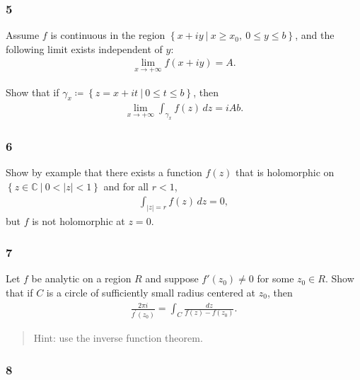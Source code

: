 \hypertarget{section-52}{%
\subsubsection{5}\label{section-52}}

Assume \(f\) is continuous in the region
\(\left\{{x+iy {~\mathrel{\Big|}~}x\geq x_0, ~ 0\leq y \leq b}\right\}\),
and the following limit exists independent of \(y\):
\begin{align*}
\lim_{x\to +\infty}f(x+iy) = A
.\end{align*}

Show that if
\(\gamma_x \coloneqq\left\{{z = x+it {~\mathrel{\Big|}~}0 \leq t \leq b}\right\}\),
then
\begin{align*}
\lim_{x\to +\infty} \int_{\gamma_x} f(z) \,dz = iAb
.\end{align*}

\hypertarget{section-53}{%
\subsubsection{6}\label{section-53}}

Show by example that there exists a function \(f(z)\) that is
holomorphic on
\(\left\{{z\in {\mathbb{C}}{~\mathrel{\Big|}~}0 < {\left\lvert {z} \right\rvert} < 1}\right\}\)
and for all \(r<1\),
\begin{align*}
\int_{{\left\lvert {z} \right\rvert} = r} f(z) \, dz = 0
,\end{align*}
but \(f\) is not holomorphic at \(z=0\).

\hypertarget{section-54}{%
\subsubsection{7}\label{section-54}}

Let \(f\) be analytic on a region \(R\) and suppose \(f'(z_0) \neq 0\)
for some \(z_0 \in R\). Show that if \(C\) is a circle of sufficiently
small radius centered at \(z_0\), then
\begin{align*}
\frac{2 \pi i}{f^{\prime}\left(z_{0}\right)}=\int_{C} \frac{d z}{f(z)-f\left(z_{0}\right)}
.\end{align*}

\begin{quote}
Hint: use the inverse function theorem.
\end{quote}

\hypertarget{section-55}{%
\subsubsection{8}\label{section-55}}

